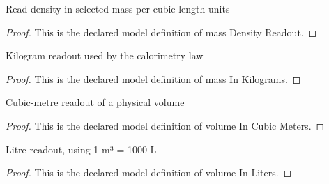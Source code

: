 \begin{definition}
  \label{def:physics:phyx-mini-0485:phyxminiproblems-problemphyxmini0485-massdensityreadout}
  Read density in selected mass-per-cubic-length units
\end{definition}
\begin{proof}
  This is the declared model definition of mass Density Readout.
\end{proof}
\begin{definition}
  \label{def:physics:phyx-mini-0485:phyxminiproblems-problemphyxmini0485-massinkilograms}
  Kilogram readout used by the calorimetry law
\end{definition}
\begin{proof}
  This is the declared model definition of mass In Kilograms.
\end{proof}
\begin{definition}
  \label{def:physics:phyx-mini-0485:phyxminiproblems-problemphyxmini0485-volumeincubicmeters}
  Cubic-metre readout of a physical volume
\end{definition}
\begin{proof}
  This is the declared model definition of volume In Cubic Meters.
\end{proof}
\begin{definition}
  \label{def:physics:phyx-mini-0485:phyxminiproblems-problemphyxmini0485-volumeinliters}
  Litre readout, using 1 m³ = 1000 L
\end{definition}
\begin{proof}
  This is the declared model definition of volume In Liters.
\end{proof}
